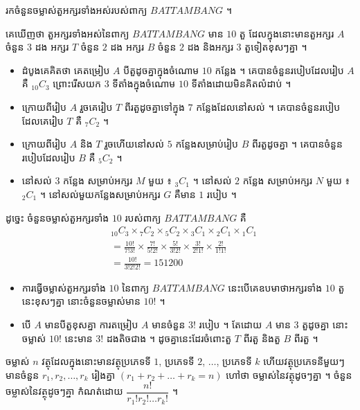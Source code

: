 \begin{example}[ឧទាហរណ៍ ២]
រកចំនួនចម្លាស់តួអក្សរទាំងអស់របស់ពាក្យ $BATTAMBANG$ ។
\end{example}
គេឃើញថា តួអក្សរទាំងអស់នៃពាក្យ $BATTAMBANG$ មាន $10$ តួ ដែលក្នុងនោះមានតួអក្សរ $A$ ចំនួន $3$ ដង អក្សរ $T$ ចំនួន $2$ ដង អក្សរ $B$ ចំនួន $2$ ដង និងអក្សរ $3$ តួទៀតខុសៗគ្នា ។
\begin{itemize}
  \item ដំបូងគេគិតថា គេតម្រៀប $A$ បីតួដូចគ្នាក្នុងចំណោម $10$ កន្លែង ។ គេបានចំនួនរបៀបដែលរៀប $A$ គឺ ${}_{10}C_3$ ព្រោះរើសយក $3$ ទីតាំងក្នុងចំណោម $10$ ទីតាំងដោយមិនគិតលំដាប់ ។
  \item ក្រោយពីរៀប $A$ រួចគេរៀប $T$ ពីរតួដូចគ្នាទៅក្នុង $7$ កន្លែងដែលនៅសល់ ។ គេបានចំនួនរបៀបដែលគេរៀប $T$ គឺ ${}_7C_2$ ។
  \item ក្រោយពីរៀប $A$ និង $T$ រួចហើយនៅសល់ $5$ កន្លែងសម្រាប់រៀប $B$ ពីរតួដូចគ្នា ។ គេបានចំនួនរបៀបដែលរៀប $B$ គឺ ${}_5C_2$ ។
  \item នៅសល់ $3$ កន្លែង សម្រាប់អក្សរ $M$ មួយ ៖ ${}_3C_1$ ។ នៅសល់ $2$ កន្លែង សម្រាប់អក្សរ $N$ មួយ ៖ ${}_2C_1$ ។ នៅសល់មួយកន្លែងសម្រាប់អក្សរ $G$ គឺមាន $1$ របៀប ។
\end{itemize}
ដូច្នេះ ចំនួនចម្លាស់តួអក្សរទាំង $10$ របស់ពាក្យ $BATTAMBANG$ គឺ
\[ \begin{aligned}
&{}_{10}C_3\times{}_7C_2\times{}_5C_2\times{}_3C_1\times{}_2C_1\times{}_1C_1\\
&= \frac{10!}{7!3!}\times\frac{7!}{5!2!}\times\frac{5!}{3!2!}\times\frac{3!}{2!1!}\times\frac{2!}{1!1!}\\
&= \frac{10!}{3!2!2!} = 151200
\end{aligned} \]

\begin{note}[សម្គាល់]
\begin{itemize}
  \item ការធ្វើចម្លាស់តួអក្សរទាំង $10$ នៃពាក្យ $BATTAMBANG$ នេះបើគេឧបមាថាអក្សរទាំង $10$ តួនេះខុសៗគ្នា នោះចំនួនចម្លាស់មាន $10!$ ។
  \item បើ $A$ មានបីតួខុសគ្នា ការតម្រៀប $A$ មានចំនួន $3!$ របៀប ។ តែដោយ $A$ មាន $3$ តួដូចគ្នា នោះចម្លាស់ $10!$ នេះមាន $3!$ ដងតិចជាង ។ ដូចគ្នានេះដែរចំពោះតួ $T$ ពីរតួ និងតួ $B$ ពីរតួ ។
\end{itemize}
\end{note}

\begin{formulaBox}[ជាទូទៅ]
ចម្លាស់ $n$ វត្ថុដែលក្នុងនោះមានវត្ថុប្រភេទទី $1$, ប្រភេទទី $2$, $\dots$, ប្រភេទទី $k$ ហើយវត្ថុប្រភេទនីមួយៗមានចំនួន $r_1, r_2, \dots, r_k$ រៀងគ្នា $(r_1 + r_2 + \dots + r_k = n)$ ហៅថា ចម្លាស់នៃវត្ថុដូចៗគ្នា ។ ចំនួនចម្លាស់នៃវត្ថុដូចៗគ្នា កំណត់ដោយ $\dfrac{n!}{r_1!r_2!\dots r_k!}$ ។
\end{formulaBox}

